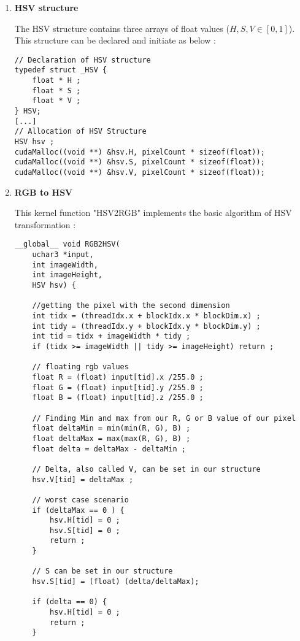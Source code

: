 \documentclass{article}
\begin{document}
    \begin{enumerate}     

    \item \textbf{HSV structure}
    
    The HSV structure contains three arrays of float values ($H,S,V \in [0,1]$). This structure can be declared and initiate as below : 
    
    \begin{verbatim}
// Declaration of HSV structure
typedef struct _HSV {
    float * H ;
    float * S ;
    float * V ;
} HSV;
[...] 
// Allocation of HSV Structure 
HSV hsv ;
cudaMalloc((void **) &hsv.H, pixelCount * sizeof(float));
cudaMalloc((void **) &hsv.S, pixelCount * sizeof(float));
cudaMalloc((void **) &hsv.V, pixelCount * sizeof(float));
    \end{verbatim}

    \item \textbf{RGB to HSV}   
    
    This kernel function "HSV2RGB" implements the basic algorithm of HSV transformation : 
    
    \begin{verbatim}
__global__ void RGB2HSV(
    uchar3 *input, 
    int imageWidth, 
    int imageHeight, 
    HSV hsv) {

    //getting the pixel with the second dimension
    int tidx = (threadIdx.x + blockIdx.x * blockDim.x) ; 
    int tidy = (threadIdx.y + blockIdx.y * blockDim.y) ;
    int tid = tidx + imageWidth * tidy ;
    if (tidx >= imageWidth || tidy >= imageHeight) return ;

    // floating rgb values
    float R = (float) input[tid].x /255.0 ;
    float G = (float) input[tid].y /255.0 ;
    float B = (float) input[tid].z /255.0 ;

    // Finding Min and max from our R, G or B value of our pixel
    float deltaMin = min(min(R, G), B) ;
    float deltaMax = max(max(R, G), B) ;
    float delta = deltaMax - deltaMin ;

    // Delta, also called V, can be set in our structure
    hsv.V[tid] = deltaMax ;

    // worst case scenario 
    if (deltaMax == 0 ) {
        hsv.H[tid] = 0 ;
        hsv.S[tid] = 0 ;
        return ;
    }

    // S can be set in our structure 
    hsv.S[tid] = (float) (delta/deltaMax);

    if (delta == 0) {
        hsv.H[tid] = 0 ; 
        return ;
    }



\end{verbatim}
\end{enumerate}
\end{document}
